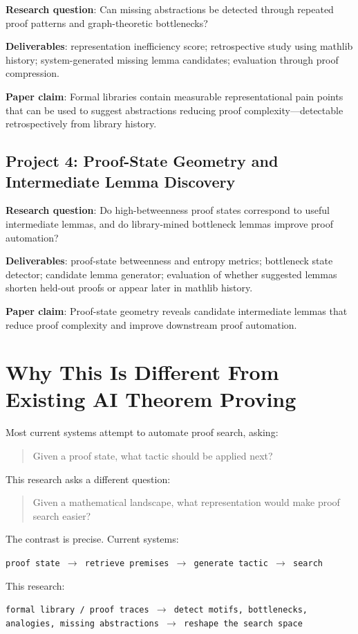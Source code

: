 \documentclass[12pt, a4paper]{article}
\begin{document}
\textbf{Research question}: Can missing abstractions be detected through
repeated proof patterns and graph-theoretic bottlenecks?

\textbf{Deliverables}: representation inefficiency score; retrospective study
using mathlib history; system-generated missing lemma candidates; evaluation
through proof compression.

\textbf{Paper claim}: Formal libraries contain measurable representational
pain points that can be used to suggest abstractions reducing proof
complexity---detectable retrospectively from library history.

\subsection{Project 4: Proof-State Geometry and Intermediate Lemma Discovery}

\textbf{Research question}: Do high-betweenness proof states correspond to
useful intermediate lemmas, and do library-mined bottleneck lemmas improve
proof automation?

\textbf{Deliverables}: proof-state betweenness and entropy metrics; bottleneck
state detector; candidate lemma generator; evaluation of whether suggested
lemmas shorten held-out proofs or appear later in mathlib history.

\textbf{Paper claim}: Proof-state geometry reveals candidate intermediate
lemmas that reduce proof complexity and improve downstream proof automation.

\section{Why This Is Different From Existing AI Theorem Proving}

Most current systems attempt to automate proof search, asking:
\begin{quote}
Given a proof state, what tactic should be applied next?
\end{quote}

This research asks a different question:
\begin{quote}
Given a mathematical landscape, what representation would make proof search
easier?
\end{quote}

The contrast is precise. Current systems:
\begin{center}
\texttt{proof state $\to$ retrieve premises $\to$ generate tactic $\to$ search}
\end{center}
This research:
\begin{center}
\texttt{formal library / proof traces $\to$ detect motifs, bottlenecks,}\\
\texttt{analogies, missing abstractions $\to$ reshape the search space}
\end{center}
\end{document}
